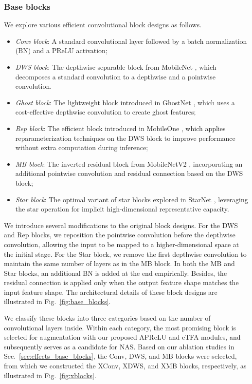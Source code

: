 \documentclass[journal]{IEEEtran}
\newcommand{\rev}[1]{#1}
\begin{document}
\subsubsection{\rev{Base} blocks}
\label{sec:base_blocks}
We explore various efficient convolutional block designs \rev{as follows}.
\begin{itemize}
    \item \textit{Conv block}: A standard convolutional layer followed by a batch normalization (BN) and a PReLU activation;
    \item \textit{DWS block}: The depthwise separable block from MobileNet \cite{MobileNet}, which decomposes a standard convolution to a depthwise and a pointwise convolution.
    \item \textit{Ghost block}: The lightweight block introduced in GhostNet \cite{GhostNet}, which uses a cost-effective depthwise convolution to create ghost features;
    \item \textit{Rep block}: The efficient block introduced in MobileOne \cite{MobileOne}, which applies reparameterization techniques on the DWS block to improve performance without extra computation during inference;
    \item \textit{MB block}: The inverted residual block from MobileNetV2 \cite{MobilenetV2}, incorporating an additional pointwise convolution and residual connection based on the DWS block;
    \item \textit{Star block}: The optimal variant of star blocks explored in StarNet \cite{StarNet}, leveraging the star operation for implicit high-dimensional representative capacity.
\end{itemize}
We introduce several modifications to the original block designs. For the DWS and Rep blocks, we reposition the pointwise convolution before the depthwise convolution, allowing the input to be mapped to a higher-dimensional space at the initial stage. For the Star block, we remove the first depthwise convolution to maintain the same number of layers as in the MB block. In both the MB and Star blocks, an additional BN is added at the end empirically. Besides, the residual connection is applied only when the output feature shape matches the input feature shape. The architectural details of these block designs are illustrated in Fig.~\ref{fig:base_blocks}.

We classify these blocks into three categories based on the number of convolutional layers inside. Within each category, the most promising block is selected for augmentation with our proposed APReLU and cTFA modules, and subsequently serves as a candidate for NAS. \rev{Based on our ablation studies in Sec.~\ref{sec:effects_base_blocks}, the Conv, DWS, and MB blocks were selected, from which we constructed the XConv, XDWS, and XMB blocks, respectively, as illustrated in Fig.~\ref{fig:xblocks}.}
\end{document}
